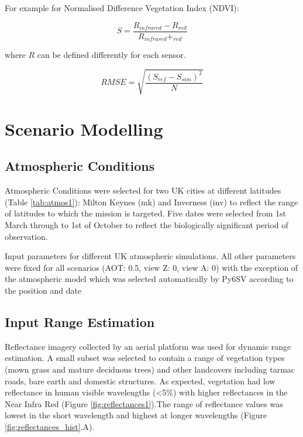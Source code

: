 \documentclass[10pt,a4paper,final,onecolumn]{article}
\begin{document}
For example for Normalised Difference Vegetation Index (NDVI):

\begin{equation}
S = \frac{R_{infrared} - R_{red}}{R_{infrared} + _{red}}
\end{equation}

where $R$ can be defined differently for each sensor.

\begin{equation}
RMSE = \sqrt{\frac{(S_{ref}-S_{sim})^{2}}{N}}
\end{equation}


\section{Scenario Modelling}

\subsection{Atmospheric Conditions}
Atmospheric Conditions were selected for two UK cities at different latitudes (Table \ref{tab:atmos1}): Milton Keynes (mk) and Inverness (inv) to reflect the range of latitudes to which the mission is targeted. Five dates were selected from 1st March through to 1st of October to reflect the biologically significant period of observation.

\begin{table}[]
    \centering
    
    \caption{Input parameters for different UK atmospheric simulations. All other parameters were fixed for all scenarios (AOT: 0.5, view Z: 0, view A: 0) with the exception of the atmospheric model which was selected automatically by Py6SV according to the position and date}
    \label{tab:atmos1}
\end{table}

\subsection{Input Range Estimation}
Reflectance imagery collected by an aerial platform was used for dynamic range estimation. A small subset was selected to contain a range of vegetation types (mown grass and mature deciduous trees) and other landcovers including tarmac roads, bare earth and domestic structures. As expected, vegetation had low reflectance in human visible wavelengths (<5\%) with higher reflectances in the Near Infra Red (Figure \ref{fig:reflectances1}).The range of reflectance values was lowest in the short wavelength and highest at longer wavelengths (Figure \ref{fig:reflectances_hist}.A).
\end{document}

